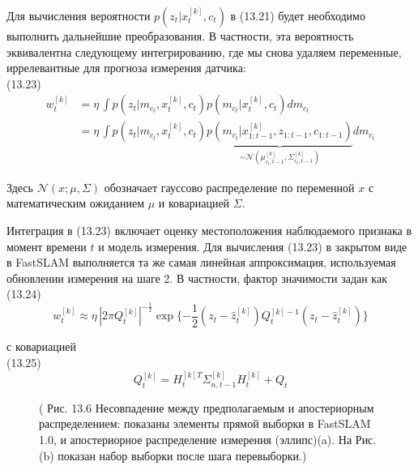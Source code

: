 \documentclass[10pt,a4paper]{article}
\begin{document}
Для вычисления вероятности $p(z_t|x_t^{[k]},c_t)$ в (13.21) будет необходимо выполнить дальнейшие преобразования. В частности, эта вероятность эквивалентна следующему интегрированию, где мы снова удаляем переменные, иррелевантные для прогноза измерения датчика:\\

(13.23)
\begin{equation*}
\begin{split}
w_t^{[k]}&=\eta\,\int p(z_t|m_{c_t},x_t^{[k]},c_t)p(m_{c_t}|x_t^{[k]},c_t)dm_{c_t}\\
&=\eta\,\int p(z_t|m_{c_t},x_t^{[k]},c_t)\underbrace{p(m_{c_t}|x_{1:t-1}^{[k]},z_{1:t-1},c_{1:t-1})}_{\sim\mathcal{N}(\mu_{c_t,t-1}^{[k]},\varSigma_{c_t,t-1}^{[k]})}dm_{c_t}
\end{split}
\end{equation*}

Здесь $\mathcal{N}(x;\mu,\varSigma)$ обозначает гауссово распределение по переменной $x$ с математическим ожиданием $\mu$ и ковариацией $\varSigma$.

Интеграция в (13.23) включает оценку местоположения наблюдаемого признака в момент времени $t$ и модель измерения. Для вычисления (13.23) в закрытом виде в FastSLAM выполняется та же самая линейная аппроксимация, используемая обновлении измерения на шаге 2. В частности, фактор значимости задан как\\

(13.24)
$$w_t^{[k]}\approx\eta\,|2\pi Q_t^{[k]}|^{-\frac{1}{2}}\exp\{-\frac{1}{2}(z_t-\hat{z}_t^{[k]})Q_t^{[k]-1}(z_t-\hat{z}_t^{[k]})\}$$

с ковариацией\\

(13.25)
$$Q_t^{[k]}=H_t^{[k]T}\varSigma_{n,t-1}^{[k]}H_t^{[k]}+Q_t$$

\begin{figure}[H]
	\caption{ ( Рис. 13.6 Несовпадение между предполагаемым и апостериорным распределением: показаны элементы прямой выборки в FastSLAM 1.0, и апостериорное распределение измерения (эллипс)(a). На Рис. (b) показан набор выборки после шага перевыборки.) }
	\label{fig:136orig}
\end{figure}
\end{document}
